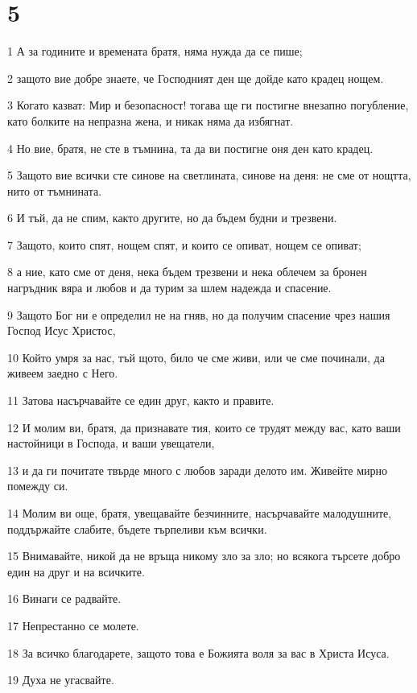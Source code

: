 \chapter{5}

\par 1 А за годините и времената братя, няма нужда да се пише;
\par 2 защото вие добре знаете, че Господният ден ще дойде като крадец нощем.
\par 3 Когато казват: Мир и безопасност! тогава ще ги постигне внезапно погубление, като болките на непразна жена, и никак няма да избягнат.
\par 4 Но вие, братя, не сте в тъмнина, та да ви постигне оня ден като крадец.
\par 5 Защото вие всички сте синове на светлината, синове на деня: не сме от нощтта, нито от тъмнината.
\par 6 И тъй, да не спим, както другите, но да бъдем будни и трезвени.
\par 7 Защото, които спят, нощем спят, и които се опиват, нощем се опиват;
\par 8 а ние, като сме от деня, нека бъдем трезвени и нека облечем за бронен нагръдник вяра и любов и да турим за шлем надежда и спасение.
\par 9 Защото Бог ни е определил не на гняв, но да получим спасение чрез нашия Господ Исус Христос,
\par 10 Който умря за нас, тъй щото, било че сме живи, или че сме починали, да живеем заедно с Него.
\par 11 Затова насърчавайте се един друг, както и правите.
\par 12 И молим ви, братя, да признавате тия, които се трудят между вас, като ваши настойници в Господа, и ваши увещатели,
\par 13 и да ги почитате твърде много с любов заради делото им. Живейте мирно помежду си.
\par 14 Молим ви още, братя, увещавайте безчинните, насърчавайте малодушните, поддържайте слабите, бъдете търпеливи към всички.
\par 15 Внимавайте, никой да не връща никому зло за зло; но всякога търсете добро един на друг и на всичките.
\par 16 Винаги се радвайте.
\par 17 Непрестанно се молете.
\par 18 За всичко благодарете, защото това е Божията воля за вас в Христа Исуса.
\par 19 Духа не угасвайте.
